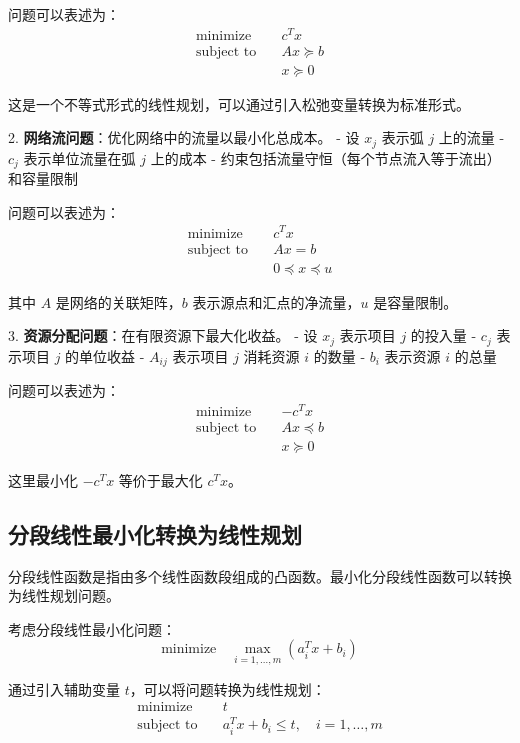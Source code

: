 \documentclass[12pt,a4paper]{book}
\begin{document}
   问题可以表述为：
   $$
   \begin{aligned}
   \text{minimize} \quad & c^T x \\
   \text{subject to} \quad & Ax \succeq b \\
   & x \succeq 0
   \end{aligned}
   $$
   
   这是一个不等式形式的线性规划，可以通过引入松弛变量转换为标准形式。

2. \textbf{网络流问题}：优化网络中的流量以最小化总成本。
   - 设 $x_j$ 表示弧 $j$ 上的流量
   - $c_j$ 表示单位流量在弧 $j$ 上的成本
   - 约束包括流量守恒（每个节点流入等于流出）和容量限制
   
   问题可以表述为：
   $$
   \begin{aligned}
   \text{minimize} \quad & c^T x \\
   \text{subject to} \quad & Ax = b \\
   & 0 \preceq x \preceq u
   \end{aligned}
   $$
   
   其中 $A$ 是网络的关联矩阵，$b$ 表示源点和汇点的净流量，$u$ 是容量限制。

3. \textbf{资源分配问题}：在有限资源下最大化收益。
   - 设 $x_j$ 表示项目 $j$ 的投入量
   - $c_j$ 表示项目 $j$ 的单位收益
   - $A_{ij}$ 表示项目 $j$ 消耗资源 $i$ 的数量
   - $b_i$ 表示资源 $i$ 的总量
   
   问题可以表述为：
   $$
   \begin{aligned}
   \text{minimize} \quad & -c^T x \\
   \text{subject to} \quad & Ax \preceq b \\
   & x \succeq 0
   \end{aligned}
   $$
   
   这里最小化 $-c^T x$ 等价于最大化 $c^T x$。

\subsection{分段线性最小化转换为线性规划}

分段线性函数是指由多个线性函数段组成的凸函数。最小化分段线性函数可以转换为线性规划问题。

考虑分段线性最小化问题：
$$
\text{minimize} \quad \max_{i=1,\dots,m} (a_i^T x + b_i)
$$

通过引入辅助变量 $t$，可以将问题转换为线性规划：
$$
\begin{aligned}
\text{minimize} \quad & t \\
\text{subject to} \quad & a_i^T x + b_i \leq t, \quad i = 1, \dots, m
\end{aligned}
$$
\end{document}
